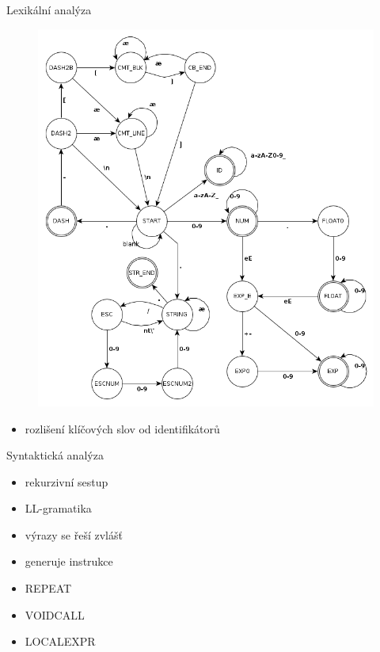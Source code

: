 \documentclass{beamer}
\begin{document}
\begin{frame}{Lexikální analýza}
  \begin{figure}
    \includegraphics[scale=0.25]{lexical.png}
  \end{figure}
  \begin{itemize}
  \item rozlišení klíčových slov od identifikátorů
  \end{itemize}
\end{frame}

\begin{frame}{Syntaktická analýza}
  \begin{itemize}
  \item rekurzivní sestup
  \item LL-gramatika
  \item výrazy se řeší zvlášť
  \item generuje instrukce
  \item REPEAT
  \item VOIDCALL
  \item LOCALEXPR
  \end{itemize}
\end{frame}
\end{document}
